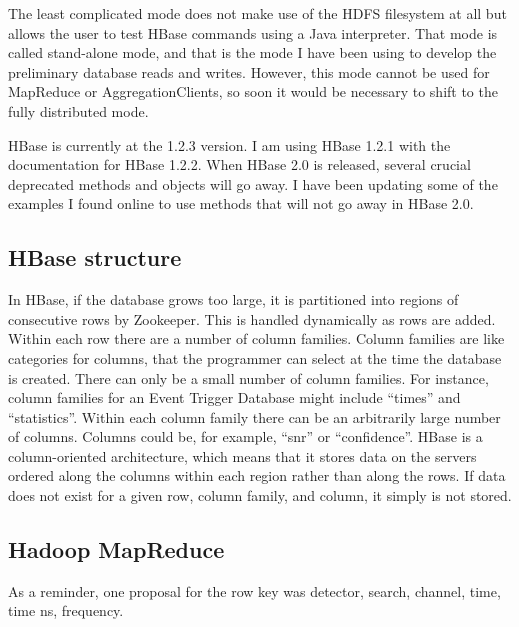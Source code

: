 \documentclass{article}
\begin{document}
The least complicated mode does not make use of the HDFS filesystem at
all but allows the user to test HBase commands using a Java
interpreter. That mode is called stand-alone mode, and that is the mode
I have been using to develop the preliminary database reads and
writes. However, this mode cannot be used for MapReduce or
AggregationClients, so soon it would be necessary to shift to the
fully distributed mode.

HBase is currently at the 1.2.3 version. I am using HBase 1.2.1 with
the documentation for HBase 1.2.2. When HBase 2.0 is released, several
crucial deprecated methods and objects will go away. I have been
updating some of the examples I found online to use methods that will
not go away in HBase 2.0.

\subsection{HBase structure}

In HBase, if the database grows too large, it is partitioned into
regions of consecutive rows by Zookeeper. This is handled dynamically
as rows are added. Within each row there are a number of column
families. Column families are like categories for columns, that the
programmer can select at the time the database is created. There can
only be a small number of column families. For instance, column
families for an Event Trigger Database might include ``times'' and
``statistics''. Within each column family there can be an arbitrarily
large number of columns. Columns could be, for example, ``snr'' or
``confidence''. HBase is a column-oriented architecture, which means
that it stores data on the servers ordered along the columns within
each region rather than along the rows. If data does not exist for a
given row, column family, and column, it simply is not stored.

\subsection{Hadoop MapReduce}


As a reminder, one proposal for the row key was detector, search,
channel, time, time ns, frequency.
\end{document}
